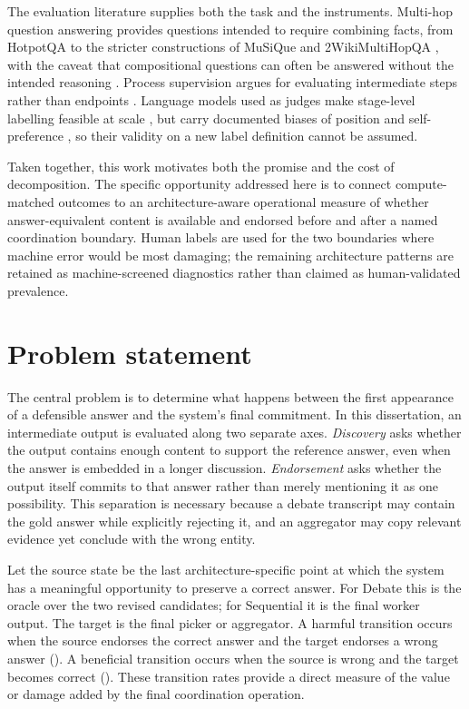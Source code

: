 The evaluation literature supplies both the task and the instruments. Multi-hop question answering provides
questions intended to require combining facts, from HotpotQA \citep{yang2018hotpotqa} to the stricter
constructions of MuSiQue and 2WikiMultiHopQA \citep{trivedi2022musique,ho2020twowiki}, with the caveat that
compositional questions can often be answered without the intended reasoning \citep{min2019compositional}.
Process supervision argues for evaluating intermediate steps rather than endpoints
\citep{lightman2023verify,uesato2022process}. Language models used as judges make stage-level labelling
feasible at scale \citep{zheng2023judge,liu2023geval}, but carry documented biases of position and
self-preference \citep{wang2024fair,panickssery2024selfpref}, so their validity on a new label definition
cannot be assumed.

Taken together, this work motivates both the promise and the cost of decomposition. The specific opportunity
addressed here is to connect compute-matched outcomes to an architecture-aware operational measure of whether
answer-equivalent content is available and endorsed before and after a named coordination boundary. Human
labels are used for the two boundaries where machine error would be most damaging; the remaining architecture
patterns are retained as machine-screened diagnostics rather than claimed as human-validated prevalence.

\section{Problem statement}

The central problem is to determine what happens between the first appearance of a defensible answer and the system's final commitment. In this dissertation, an intermediate output is evaluated along two separate axes. \emph{Discovery} asks whether the output contains enough content to support the reference answer, even when the answer is embedded in a longer discussion. \emph{Endorsement} asks whether the output itself commits to that answer rather than merely mentioning it as one possibility. This separation is necessary because a debate transcript may contain the gold answer while explicitly rejecting it, and an aggregator may copy relevant evidence yet conclude with the wrong entity.

Let the source state be the last architecture-specific point at which the system has a meaningful opportunity to preserve a correct answer. For Debate this is the oracle over the two revised candidates; for Sequential it is the final worker output. The target is the final picker or aggregator. A harmful transition occurs when the source endorses the correct answer and the target endorses a wrong answer (\ctow). A beneficial transition occurs when the source is wrong and the target becomes correct (\wtoc). These transition rates provide a direct measure of the value or damage added by the final coordination operation.


